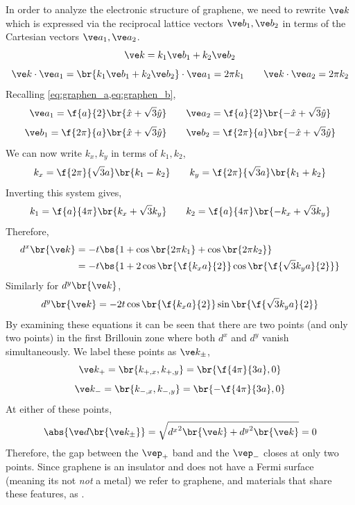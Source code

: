 \documentclass{article}
\begin{document}
In order to analyze the electronic structure of graphene, we need to rewrite $\ve k$ which is expressed via the reciprocal lattice vectors $\ve b_1, \ve b_2$ in terms of the Cartesian vectors $\ve a_1, \ve a_2$.
\[ \ve k = k_1 \ve b_1 + k_2 \ve b_2 \]
\[ \ve k \cdot \ve a_1 = \br{k_1 \ve b_1 + k_2 \ve b_2} \cdot \ve a_1 = 2 \pi k_1 \qquad \ve k \cdot \ve a_2 = 2 \pi k_2 \]
Recalling \cref{eq:graphen_a,eq:graphen_b},
\[ \ve a_{1} = \f{a}{2} \br{\hat x + \sqrt{3} \hat y} \qquad \ve a_{2} = \f{a}{2} \br{-\hat x + \sqrt{3} \hat y} \]
\[ \ve b_{1} = \f{2 \pi}{a} \br{\hat x + \sqrt{3} \hat y} \qquad \ve b_{2} = \f{2 \pi}{a} \br{-\hat x + \sqrt{3} \hat y}\]
We can now write $k_x, k_y$ in terms of $k_1, k_2$,
\[ k_x = \f{2 \pi }{\sqrt{3}a} \br{k_1 - k_2} \qquad k_y = \f{2 \pi}{\sqrt{3}a} \br{k_1 + k_2} \]
Inverting this system gives,
\[ k_1 = \f{a}{4 \pi} \br{k_x + \sqrt{3} k_y} \qquad k_2 = \f{a}{4 \pi} \br{-k_x + \sqrt{3} k_y} \]
Therefore,
\begin{align*}
    d^{x}\br{\ve k}
    &= - t\bs{1 + \cos\br{2 \pi k_1} + \cos\br{2 \pi k_2}} \\
    &= - t\bs{1 + 2\cos\br{\f{k_xa}{2}}\cos\br{\f{\sqrt{3}k_ya}{2}}}
\end{align*}
Similarly for $d^{y}\br{\ve k}$,
\[ d^{y}\br{\ve k} = -2 t \cos\br{\f{k_x a}{2}} \sin\br{\f{\sqrt{3} k_y a}{2}} \]
By examining these equations it can be seen that there are two points (and only two points) in the first Brillouin zone where both $d^{x}$ and $d^y$ vanish simultaneously. We label these points as $\ve k_{\pm}$,
\[ \ve k_+ = \br{k_{+, x}, k_{+, y}} = \br{\f{4 \pi }{3a}, 0} \]
\[ \ve k_- = \br{k_{-, x}, k_{-, y}} = \br{-\f{4 \pi }{3a}, 0} \]
At either of these points,
\[ \abs{\ve d \br{\ve k_{\pm}}} = \sqrt{{d^x}^2\br{\ve k} + {d^y}^2\br{\ve k}} = 0 \]
Therefore, the gap between the $\vep_{+}$ band and the $\vep_{-}$ closes at only two points. Since graphene is an insulator and does not have a Fermi surface (meaning its not \textit{not} a metal) we refer to graphene, and materials that share these features, as . \\
\end{document}
